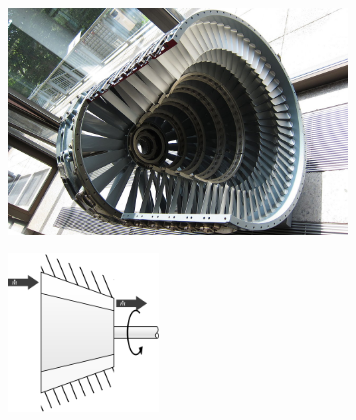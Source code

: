 		\begin{figure}
			\begin{center}
				\includegraphics[width=9cm]{images/photo_compresseur.jpg}
			\end{center}
			\label{fig_schéma_compresseur1}
		\end{figure}

		\begin{figure}
			\begin{center}
				\includegraphics[width=4cm]{images/symbole_compresseur.png}
			\end{center}
			\label{fig_schéma_compresseur2}
		\end{figure}

